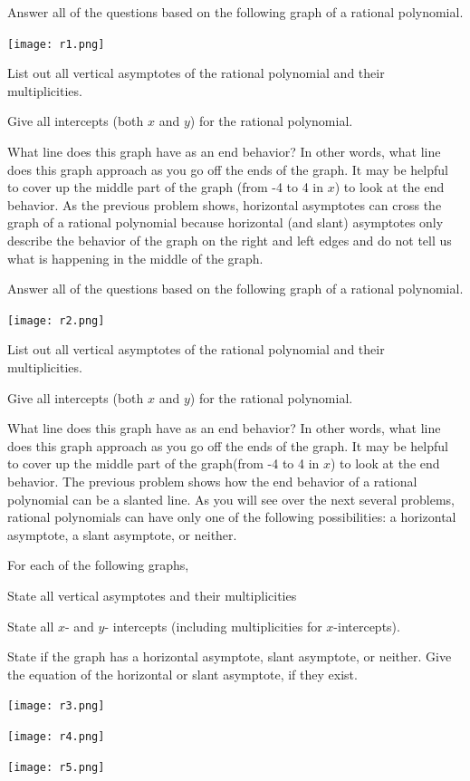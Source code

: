 \bq Answer all of the questions based on the following graph of a rational polynomial.
\begin{center} \texttt{[image: r1.png]} \end{center}
\be
\item List out all vertical asymptotes of the rational polynomial and their multiplicities.
\item Give all intercepts (both $x$ and $y$) for the rational polynomial.
\item What line does this graph have as an end behavior? In other words, what line does this graph approach as you go off the ends of the graph. It may be helpful to cover up the middle part of the graph (from -4 to 4 in $x$) to look at the end behavior.
\ee
\eq
As the previous problem shows, horizontal asymptotes can cross the graph of a rational polynomial because horizontal (and slant) asymptotes only describe the behavior of the graph on the right and left edges and do not tell us what is happening in the middle of the graph.

\bq Answer all of the questions based on the following graph of a rational polynomial.
\begin{center} \texttt{[image: r2.png]} \end{center}
\be
\item List out all vertical asymptotes of the rational polynomial and their multiplicities.
\item Give all intercepts (both $x$ and $y$) for the rational polynomial.
\item What line does this graph have as an end behavior? In other words, what line does this graph approach as you go off the ends of the graph. It may be helpful to cover up the middle part of the graph(from -4 to 4 in $x$) to look at the end behavior.
\ee
\eq
The previous problem shows how the end behavior of a rational polynomial can be a slanted line. As you will see over the next several problems, rational polynomials can have only one of the following possibilities: a horizontal asymptote, a slant asymptote, or neither.

\bq For each of the following graphs,
\be
\item State all vertical asymptotes and their multiplicities
\item State all $x$- and $y$- intercepts (including multiplicities for $x$-intercepts).
\item State if the graph has a horizontal asymptote, slant asymptote, or neither. Give the equation of the horizontal or slant asymptote, if they exist.
\ee
\begin{center} \texttt{[image: r3.png]}

\texttt{[image: r4.png]}

\texttt{[image: r5.png]} \end{center}

